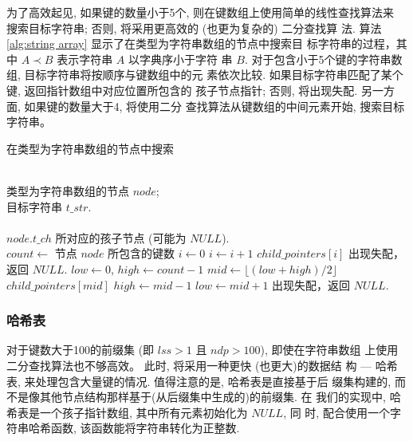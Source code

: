 为了高效起见, 如果键的数量小于5个, 则在键数组上使用简单的线性查找算法来
搜索目标字符串; 否则, 将采用更高效的 (也更为复杂的) 二分查找算
法. 算法 \ref{alg:string array} 显示了在类型为字符串数组的节点中搜索目
标字符串的过程，其中 $A \prec B$ 表示字符串 $A$ 以字典序小于字符
串 $B$. 对于包含小于5个键的字符串数组, 目标字符串将按顺序与键数组中的元
素依次比较. 如果目标字符串匹配了某个键, 返回指针数组中对应位置所包含的
孩子节点指针; 否则, 将出现失配. 另一方面, 如果键的数量大于4, 将使用二分
查找算法从键数组的中间元素开始, 搜索目标字符串。

\begin{algorithm}
  \caption{在类型为字符串数组的节点中搜索}\scriptsize
  \label{alg:string array}
  \begin{algorithmic}[1]
    \REQUIRE ~~\\
    类型为字符串数组的节点 $node$; \\
    目标字符串 $t\_str$.\\
    \ENSURE ~~\\
     $node.t\_ch$ 所对应的孩子节点 (可能为 $NULL$).\\
    \STATE
    \STATE $count \leftarrow$ 节点 $node$  所包含的键数
    \STATE
    \STATE $i \leftarrow 0$
    \STATE $i \leftarrow i+1$
    \ENDWHILE
    \RETURN $child\_pointers[i]$
    \ELSE
    \STATE 出现失配，返回 $NULL$.
    \ENDIF
    \ELSE
    \STATE $low \leftarrow 0$, $high \leftarrow count-1$
    \STATE $mid \leftarrow \lfloor (low+high)/2 \rfloor$
    \RETURN $child\_pointers[mid]$
    \STATE $high \leftarrow mid - 1$
    \ELSE
    \STATE $low \leftarrow mid + 1$
    \ENDIF
    \ENDWHILE
    \STATE 出现失配，返回 $NULL$.
    \ENDIF
  \end{algorithmic}
\end{algorithm}

\subsubsection{哈希表}
\label{sec:hash table}

对于键数大于100的前缀集 (即 $lss > 1$ 且 $ndp > 100$), 即使在字符串数组
上使用二分查找算法也不够高效。 此时, 将采用一种更快 (也更大)的数据结
构 --- 哈希表, 来处理包含大量键的情况. 值得注意的是, 哈希表是直接基于后
缀集构建的, 而不是像其他节点结构那样基于(从后缀集中生成的)的前缀集. 在
我们的实现中, 哈希表是一个孩子指针数组, 其中所有元素初始化为 $NULL$, 同
时, 配合使用一个字符串哈希函数, 该函数能将字符串转化为正整数.

